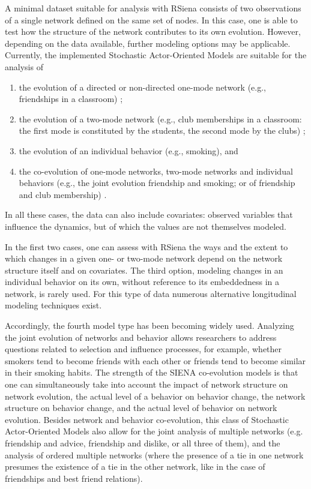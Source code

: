 \documentclass[a4paper,fleqn,11pt]{article}
\newcommand{\+}{\, + \,}
\newcommand{\RS}{{\sf \textsf{RSiena} }}
\newcommand{\SI}{{\sf SIENA }}
\newcommand{\saom}{{Stochastic Actor-Oriented Model}}
\begin{document}
A minimal dataset suitable for analysis with \RS consists of two observations of
a single network defined on the same set of nodes. In this case, one is able to
test how the structure of the network contributes to its own evolution.
However, depending on the data available, further modeling options may be
applicable. Currently, the implemented {\saom}s
are suitable for the analysis of
\begin{enumerate}
	\item	the evolution of a directed or non-directed one-mode network
        (e.g., friendships in a classroom) \citep{Snijders01};
	\item	the evolution of a two-mode network
        (e.g., club memberships in a classroom: the first mode
        is constituted by the students, the second mode by the clubs)
        \citep{KoskinenEdling2012};
	\item	the evolution of an individual behavior (e.g., smoking), and
	\item	the co-evolution of one-mode networks, two-mode networks and
        individual behaviors (e.g., the joint evolution friendship and smoking;
        or of friendship and club membership) \citep{SteglichEA10, SLT2013}.
\end{enumerate}
In all these cases, the data can also include covariates: observed variables
that influence the dynamics, but of which the values are not themselves
modeled.

In the first two cases, one can assess with \RS the ways and the extent
to which changes in a given one- or two-mode network depend on the network
structure itself and on covariates. The third option, modeling changes in
an individual behavior on its own, without reference to its embeddedness
in a network, is rarely used.
For this type of data numerous alternative longitudinal modeling techniques
exist.

Accordingly, the fourth model type has been becoming widely used.
Analyzing the joint evolution of networks and behavior allows researchers
to address questions related to selection and influence processes, for
example, whether smokers tend to become friends with each other or friends
 tend to become similar in their smoking habits. The strength of the \SI
co-evolution models is that one can simultaneously take into account
the impact of network structure on network evolution, the actual level
of a behavior on behavior change, the network structure on behavior change,
and the actual level of behavior on network evolution. Besides network and
behavior co-evolution, this class of {\saom}s
also allow for the joint analysis of multiple networks (e.g. friendship
and advice, friendship and dislike, or all three of them), and the
analysis of ordered multiple networks (where the presence of a tie
in one network presumes the existence of a tie in the other network,
like in the case of friendships and best friend relations).
\end{document}
